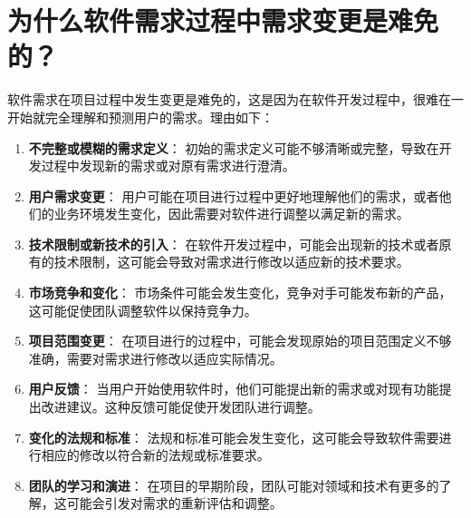 \documentclass[11pt, a4paper, oneside]{ctexbook}
\begin{document}
\chapter{为什么软件需求过程中需求变更是难免的？}

软件需求在项目过程中发生变更是难免的，这是因为在软件开发过程中，很难在一开始就完全理解和预测用户的需求。理由如下：

\begin{enumerate}
    \item {\bfseries\kaishu 不完整或模糊的需求定义}： 初始的需求定义可能不够清晰或完整，导致在开发过程中发现新的需求或对原有需求进行澄清。
    \item {\bfseries\kaishu 用户需求变更}： 用户可能在项目进行过程中更好地理解他们的需求，或者他们的业务环境发生变化，因此需要对软件进行调整以满足新的需求。
    \item {\bfseries\kaishu 技术限制或新技术的引入}： 在软件开发过程中，可能会出现新的技术或者原有的技术限制，这可能会导致对需求进行修改以适应新的技术要求。
    \item {\bfseries\kaishu 市场竞争和变化}： 市场条件可能会发生变化，竞争对手可能发布新的产品，这可能促使团队调整软件以保持竞争力。
    \item {\bfseries\kaishu 项目范围变更}： 在项目进行的过程中，可能会发现原始的项目范围定义不够准确，需要对需求进行修改以适应实际情况。
    \item {\bfseries\kaishu 用户反馈}： 当用户开始使用软件时，他们可能提出新的需求或对现有功能提出改进建议。这种反馈可能促使开发团队进行调整。
    \item {\bfseries\kaishu 变化的法规和标准}： 法规和标准可能会发生变化，这可能会导致软件需要进行相应的修改以符合新的法规或标准要求。
    \item {\bfseries\kaishu 团队的学习和演进}： 在项目的早期阶段，团队可能对领域和技术有更多的了解，这可能会引发对需求的重新评估和调整。
\end{enumerate}
\end{document}
